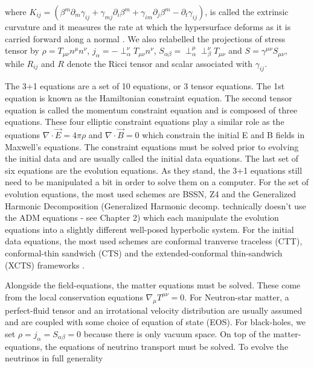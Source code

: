 where $K_{ij} = (\beta^m\partial_m\gamma_{ij} + \gamma_{mj}\partial_{i}\beta^{m} + \gamma_{im}\partial_j\beta^{m}-\partial_{t}\gamma_{ij})$, is called the extrinsic curvature and it measures
the rate at which the hypersurface deforms as it is carried forward along a normal \cite{baumgarte2010numerical}. We also relabelled the projections of stress tensor by $\rho = T_{\mu\nu} n^{\mu} n^{\nu}$, $j_{\alpha}= -\perp^{\nu}_{\alpha} T_{\mu\nu} n^{\nu}$, $S_{\alpha\beta} = \perp^{\mu}_{\alpha} \perp^{\nu}_{\beta} T_{\mu\nu}$ and $S=\gamma^{\mu\nu} S_{\mu\nu}$, while $R_{ij}$ and $R$ denote the Ricci tensor and scalar associated with $\gamma_{ij}$.

The 3+1 equations are a set of 10 equations, or 3 tensor equations. The 1st equation is known as the Hamiltonian constraint equation. The second tensor equation is called the momentum constraint equation and is composed of three equations. These four elliptic constraint equations play a similar role as the equations $\nabla \cdot \vec E = 4\pi\rho$ and $\nabla \cdot \vec B = 0$ which constrain the initial E and B fields in Maxwell's equations. The constraint equations must be solved prior to evolving the initial data and are usually called the initial data equations. The last set of six equations are the evolution equations. As they stand, the 3+1 equations still need to be manipulated a bit in order to solve them on a computer. For the set of evolution equations, the most used schemes are BSSN, Z4 and the Generalized Harmonic Decomposition (Generalized Harmonic decomp. technically doesn't use the ADM equations - see Chapter 2) which each manipulate the evolution equations into a slightly different well-posed hyperbolic system. For the initial data equations, the most used schemes are conformal tranverse traceless (CTT), conformal-thin sandwich (CTS) and the extended-conformal thin-sandwich (XCTS) frameworks \cite{pfeiffer-york:2005,alcubierre2012introduction,sopuerta2015gravitational}.

Alongside the field-equations, the matter equations must be solved. These come from the local conservation equations $\nabla_{\mu}T^{\mu\nu} = 0$. For Neutron-star matter, a perfect-fluid tensor and an irrotational velocity distribution are usually assumed and are coupled with some choice of equation of state (EOS). For black-holes, we set $\rho = j_{\alpha} = S_{\alpha\beta} = 0$ because there is only vacuum space. On top of the matter-equations, the equations of neutrino transport must be solved. To evolve the neutrinos in full generality

